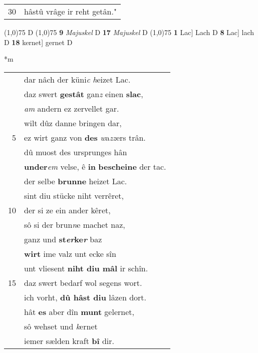 \documentclass[8pt,a4paper,notitlepage]{article}
\begin{document}
\begin{table}[ht]
\begin{minipage}[t]{0.5\linewidth}
\begin{tabular}{rl}
30 & hâstû vrâge ir reht getân."\\ 
\end{tabular}
\scriptsize
\line(1,0){75} \newline
D \newline
\line(1,0){75} \newline
\textbf{9} \textit{Majuskel} D  \textbf{17} \textit{Majuskel} D  \newline
\line(1,0){75} \newline
\textbf{1} Lac] Lach D \textbf{8} Lac] lach D \textbf{18} kernet] gernet D \newline
\end{minipage}
\hspace{0.5cm}
\begin{minipage}[t]{0.5\linewidth}
\small
\begin{center}*m
\end{center}
\begin{tabular}{rl}
 & dar nâch der küni\textit{c} \textit{h}eizet Lac.\\ 
 & daz swert \textbf{gestât} gan\textit{z} einen \textbf{slac},\\ 
 & \textit{am} andern ez zervellet gar.\\ 
 & wilt dûz danne bringen dar,\\ 
5 & ez wirt ganz von \textbf{des} \textit{w}a\textit{zz}ers trân.\\ 
 & dû muost des ursprunges hân\\ 
 & \textbf{under}\textit{em} velse, ê \textbf{in} \textbf{bescheine} der tac.\\ 
 & der selbe \textbf{brunne} heizet Lac.\\ 
 & sint diu stücke niht verrêret,\\ 
10 & der si ze ein ander kêret,\\ 
 & sô si der brun\textit{n}e machet naz,\\ 
 & ganz und \textbf{st\textit{er}ke\textit{r}} baz\\ 
 & \textbf{wirt} ime valz unt ecke sîn\\ 
 & unt vliesent \textbf{niht diu mâl} ir schîn.\\ 
15 & daz swert bedarf wol segens wort.\\ 
 & ich vorht, \textbf{dû hâst diu} lâzen dort.\\ 
 & hât \textbf{es} aber dîn \textbf{munt} gelernet,\\ 
 & sô wehset und \textit{k}ernet\\ 
 & iemer sælden kraft \textbf{bî} dir.\\ 

\end{tabular}
\end{minipage}
\end{table}
\end{document}
